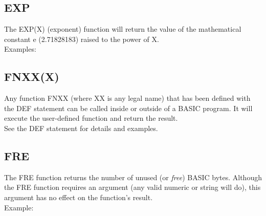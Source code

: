 \subsection{EXP}

The {\ttfamily EXP(X)} (exponent) function will return the value of the
mathematical constant {\ttfamily e} (2.71828183) raised to the power of
{\ttfamily X}.\\

Examples:\\


\subsection{FNXX(X)}

Any function {\ttfamily FNXX} (where {\ttfamily XX} is any legal name) that has
been defined with the {\ttfamily DEF} statement can be called inside or outside
of a BASIC program.  It will execute the user-defined function and return the
result.\\

See the {\ttfamily DEF} statement for details and examples.\\

\subsection{FRE}

The {\ttfamily FRE} function returns the number of unused (or {\em free}) BASIC
bytes.  Although the {\ttfamily FRE} function requires an argument (any valid
numeric or string will do), this argument has no effect on the function's
result.\\

Example:\\


